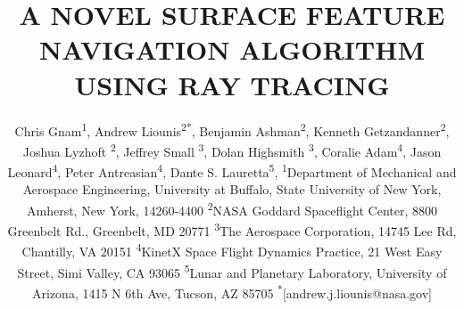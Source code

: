\documentclass{src/RPI-SIW}
\begin{document}
\title{A NOVEL SURFACE FEATURE NAVIGATION ALGORITHM USING RAY
TRACING}

\author{
    Chris Gnam\textsuperscript{1},
	Andrew Liounis\textsuperscript{2}\textsuperscript{*},
    Benjamin Ashman\textsuperscript{2},
    Kenneth Getzandanner\textsuperscript{2},
    Joshua Lyzhoft \textsuperscript{2},
    Jeffrey Small \textsuperscript{3},
    Dolan Highsmith \textsuperscript{3},
    Coralie Adam\textsuperscript{4},
    Jason Leonard\textsuperscript{4},
    Peter Antreasian\textsuperscript{4},
    Dante S. Lauretta\textsuperscript{5},
	\textsuperscript{1}Department of Mechanical and Aerospace Engineering, University at Buffalo, State University of New York, Amherst, New York, 14260-4400
    \textsuperscript{2}NASA Goddard Spaceflight Center, 8800 Greenbelt Rd., Greenbelt, MD 20771
    \textsuperscript{3}The Aerospace Corporation, 14745 Lee Rd, Chantilly, VA 20151
    \textsuperscript{4}KinetX Space Flight Dynamics Practice, 21 West Easy Street, Simi Valley, CA 93065
    \textsuperscript{5}Lunar and Planetary Laboratory, University of Arizona, 1415 N 6th Ave, Tucson, AZ 85705
    \textsuperscript{*}[andrew.j.liounis@nasa.gov]
}

\maketitle{}

\end{document}
